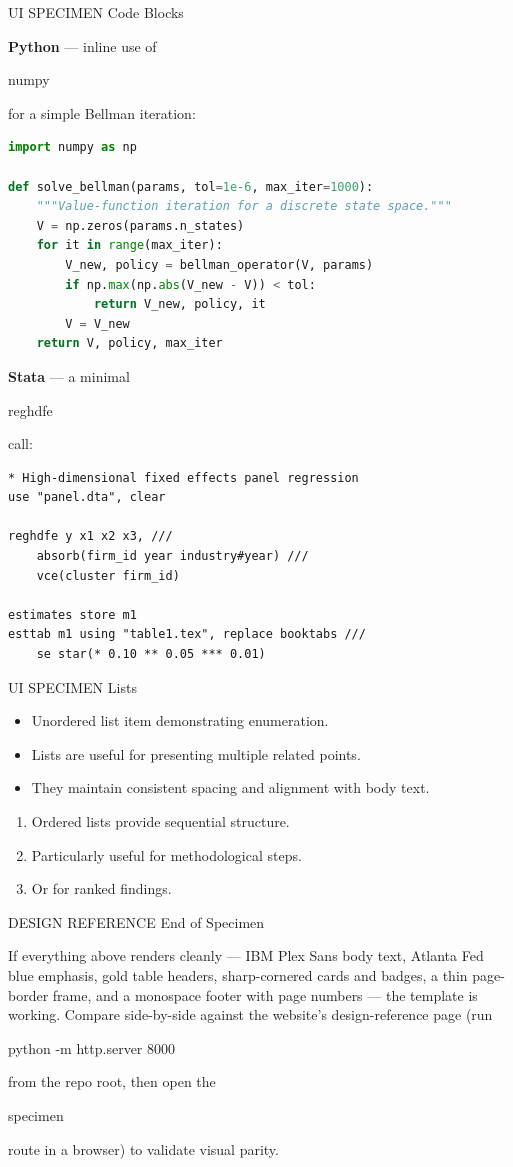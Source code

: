 \documentclass[11pt]{article}
\let\sptextbf\textbf
\renewcommand{\textbf}[1]{{\color{textstrong}\sptextbf{#1}}}
\newcommand{\sparkscaption}[2]{%
  \par\vspace{0.4em}%
  {\noindent\ttfamily\footnotesize\color{inkmuted}\MakeUppercase{#1}}\;%
  {\color{inkmuted}\textbar}\;%
  {\footnotesize\color{textprimary}#2}\par%
  \vspace{0.3em}%
}
\newcommand{\sparksrule}{\par\vspace{0.5em}{\color{inkmuted}\hrule height 0.4pt}\vspace{0.5em}}
\newcommand{\sparkscode}[1]{{\setlength{\fboxsep}{1.5pt}%
  \colorbox{codebg}{\strut\ttfamily\small #1}}}
\begin{document}
\sparksrule

\sparkscaption{UI Specimen}{Code Blocks}

\textbf{Python} --- inline use of \sparkscode{numpy} for a simple Bellman iteration:

\begin{lstlisting}[language=Python]
import numpy as np

def solve_bellman(params, tol=1e-6, max_iter=1000):
    """Value-function iteration for a discrete state space."""
    V = np.zeros(params.n_states)
    for it in range(max_iter):
        V_new, policy = bellman_operator(V, params)
        if np.max(np.abs(V_new - V)) < tol:
            return V_new, policy, it
        V = V_new
    return V, policy, max_iter
\end{lstlisting}

\textbf{Stata} --- a minimal \sparkscode{reghdfe} call:

\begin{lstlisting}
* High-dimensional fixed effects panel regression
use "panel.dta", clear

reghdfe y x1 x2 x3, ///
    absorb(firm_id year industry#year) ///
    vce(cluster firm_id)

estimates store m1
esttab m1 using "table1.tex", replace booktabs ///
    se star(* 0.10 ** 0.05 *** 0.01)
\end{lstlisting}

\sparksrule

\sparkscaption{UI Specimen}{Lists}

\begin{itemize}
    \item Unordered list item demonstrating enumeration.
    \item Lists are useful for presenting multiple related points.
    \item They maintain consistent spacing and alignment with body text.
\end{itemize}

\begin{enumerate}
    \item Ordered lists provide sequential structure.
    \item Particularly useful for methodological steps.
    \item Or for ranked findings.
\end{enumerate}

\sparksrule

\sparkscaption{Design Reference}{End of Specimen}

If everything above renders cleanly --- IBM Plex Sans body text, Atlanta Fed blue
emphasis, gold table headers, sharp-cornered cards and badges, a thin page-border
frame, and a monospace footer with page numbers --- the template is working.
Compare side-by-side against the website's design-reference page (run
\sparkscode{python -m http.server 8000} from the repo root, then open the
\sparkscode{specimen} route in a browser) to validate visual parity.
\end{document}
